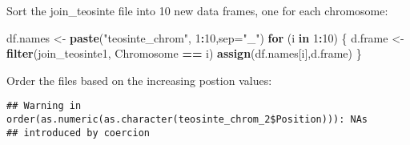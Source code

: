 \documentclass[]{article}
\newenvironment{Shaded}{\begin{snugshade}}{\end{snugshade}}
\newcommand{\ControlFlowTok}[1]{\textcolor[rgb]{0.13,0.29,0.53}{\textbf{#1}}}
\newcommand{\DataTypeTok}[1]{\textcolor[rgb]{0.13,0.29,0.53}{#1}}
\newcommand{\DecValTok}[1]{\textcolor[rgb]{0.00,0.00,0.81}{#1}}
\newcommand{\KeywordTok}[1]{\textcolor[rgb]{0.13,0.29,0.53}{\textbf{#1}}}
\newcommand{\NormalTok}[1]{#1}
\newcommand{\OperatorTok}[1]{\textcolor[rgb]{0.81,0.36,0.00}{\textbf{#1}}}
\newcommand{\StringTok}[1]{\textcolor[rgb]{0.31,0.60,0.02}{#1}}
\begin{document}
Sort the join\_teosinte file into 10 new data frames, one for each
chromosome:

\begin{Shaded}
\begin{Highlighting}[]
\NormalTok{df.names <-}\StringTok{ }\KeywordTok{paste}\NormalTok{(}\StringTok{"teosinte_chrom"}\NormalTok{, }\DecValTok{1}\OperatorTok{:}\DecValTok{10}\NormalTok{,}\DataTypeTok{sep=}\StringTok{"_"}\NormalTok{)}
\ControlFlowTok{for}\NormalTok{ (i }\ControlFlowTok{in} \DecValTok{1}\OperatorTok{:}\DecValTok{10}\NormalTok{) \{}
\NormalTok{  d.frame <-}\StringTok{ }\KeywordTok{filter}\NormalTok{(join_teosinte1, Chromosome }\OperatorTok{==}\StringTok{ }\NormalTok{i)}
  \KeywordTok{assign}\NormalTok{(df.names[i],d.frame)}
\NormalTok{\}}
\end{Highlighting}
\end{Shaded}

Order the files based on the increasing postion values:

\begin{Shaded}
\end{Shaded}

\begin{verbatim}
## Warning in order(as.numeric(as.character(teosinte_chrom_2$Position))): NAs
## introduced by coercion
\end{verbatim}

\begin{Shaded}
\end{Shaded}
\end{document}
